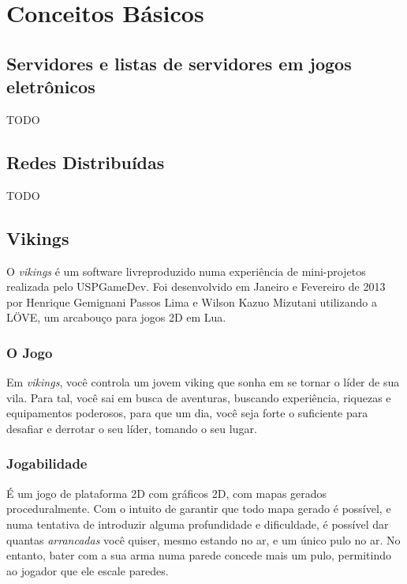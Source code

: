 \chapter{Conceitos Básicos}
\label{sec:conceitos}

\section{Servidores e listas de servidores em jogos eletrônicos}
\label{sec:conceitos:servidores}
    TODO

\section{Redes Distribuídas}
\label{sec:conceitos:redes}
    TODO

\section{Vikings}
\label{sec:conceitos:vikings}
  O \textit{vikings} é um software livre\footnotemark produzido numa experiência de mini-projetos realizada pelo USPGameDev\footnotemark. 
  Foi desenvolvido em Janeiro e Fevereiro de 2013 por Henrique Gemignani Passos Lima e Wilson Kazuo Mizutani 
  utilizando a LÖVE, um arcabouço para jogos 2D em Lua.


  \subsection{O Jogo}
    Em \textit{vikings}, você controla um jovem viking que sonha em se tornar o líder de sua vila. Para tal,
    você sai em busca de aventuras, buscando experiência, riquezas e equipamentos poderosos, para que um dia,
    você seja forte o suficiente para desafiar e derrotar o seu líder, tomando o seu lugar.
        
  \subsection{Jogabilidade}
    É um jogo de plataforma 2D com gráficos 2D, com mapas gerados proceduralmente. Com o intuito de garantir
    que todo mapa gerado é possível, e numa tentativa de introduzir alguma profundidade e dificuldade, é
    possível dar quantas \textit{arrancadas} você quiser, mesmo estando no ar, e um único pulo no ar. No
    entanto, bater com a sua arma numa parede concede mais um pulo, permitindo ao jogador que ele escale
    paredes.
    
